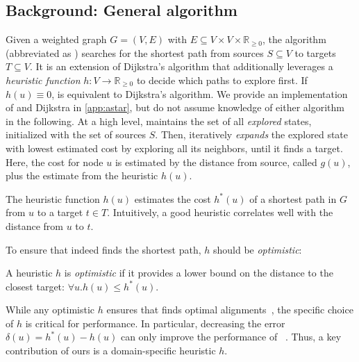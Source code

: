 \subsection{Background: General \A algorithm} \label{subsec:general-astar}
Given a weighted graph $G=(V,E)$ with $E \subseteq V \times V \times
\mathbb{R}_{\geq 0}$, the \A algorithm (abbreviated as \A) searches for the
shortest path from sources $S \subseteq V$ to targets $T \subseteq V$. It is an
extension of Dijkstra's algorithm that additionally leverages a \emph{heuristic
function} $h \colon V \to \mathbb{R}_{\geq 0}$ to decide which paths to explore
first.
%
If $h(u) \equiv 0$, \A is equivalent to Dijkstra's algorithm.
%
We provide an implementation of \A and Dijkstra in \cref{app:astar}, but do not
assume knowledge of either algorithm in the following.
%
At a high level, \A maintains the set of all \emph{explored} states, initialized
with the set of sources $S$. Then, \A iteratively \emph{expands} the explored
state with lowest estimated cost by exploring all its neighbors, until it finds
a target. Here, the cost for node $u$ is estimated by the distance from source, called $g(u)$, plus the estimate from the heuristic $h(u)$.


The heuristic function $h(u)$ estimates the
cost $h^*(u)$ of a shortest path in $G$ from $u$ to a target $t \in T$. Intuitively, a
good heuristic correlates well with the distance from $u$ to $t$.

To ensure that \A indeed finds the shortest path, $h$ should be
\emph{optimistic}:

\begin{definition} A heuristic $h$ is \textit{optimistic}
    if it provides a lower bound on the distance to the closest target: $\forall u. h(u) \leq h^*(u)$.
\end{definition}

While any optimistic $h$ ensures that \A finds optimal
alignments~\cite[Res.~3]{dechter_generalized_1985}, the specific choice of $h$
is critical for performance. In particular, decreasing the error $\delta(u) =
h^*(u)-h(u)$ can only improve the performance of
\A~\cite[Res.~6]{dechter_generalized_1985}. Thus, a key contribution of ours is a domain-specific heuristic $h$.
